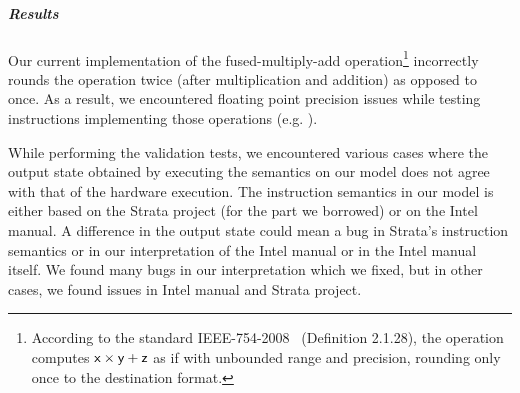
\subparagraph{Results}

Our current implementation of the fused-multiply-add operation\footnote{According to the standard IEEE-754-2008~\cite{FP} (Definition 2.1.28), the operation  computes $\textsf{x} \times \textsf{y} + \textsf{z}$ as if with unbounded range and precision, rounding only once to the destination format.} incorrectly rounds the operation twice (after multiplication and addition) as opposed to once. As a result, we encountered floating point precision issues while testing instructions implementing those operations (e.g. ).
 
 
While performing the validation tests, we encountered various cases where the output state obtained by executing the semantics on our model does not agree with that of the hardware execution. 
The instruction semantics in our model is either based on the Strata project (for the part we borrowed) or on the Intel manual. A difference in the output state could mean a bug in Strata's instruction semantics or in our interpretation of the Intel manual or in the Intel manual itself. We found many bugs in our interpretation which we fixed, but in other cases, we found issues  in Intel manual and Strata project.

